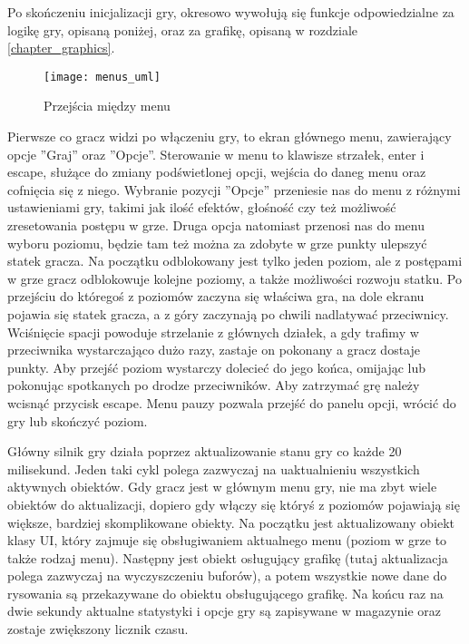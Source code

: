 Po skończeniu inicjalizacji gry, okresowo wywołują się funkcje odpowiedzialne za logikę gry, opisaną poniżej, oraz za grafikę, opisaną w rozdziale \ref{chapter_graphics}.
\newpage


\begin{wrapfigure}{r}{0.39\textwidth}
	\centering
	\noindent\texttt{[image: menus\_uml]}
	\caption{Przej\'scia między menu}
\end{wrapfigure}
Pierwsze co gracz widzi po włączeniu gry, to ekran głównego menu, zawierający opcje ''Graj'' oraz ''Opcje''. Sterowanie w menu to klawisze strzałek, enter i escape, służące do zmiany pod\'swietlonej opcji, wej\'scia do daneg menu oraz cofnięcia się z niego. Wybranie pozycji ''Opcje'' przeniesie nas do menu z różnymi ustawieniami gry, takimi jak ilo\'sć efektów, gło\'sno\'sć czy też możliwo\'sć zresetowania postępu w grze. Druga opcja natomiast przenosi nas do menu wyboru poziomu, będzie tam też można za zdobyte w grze punkty ulepszyć statek gracza. Na początku odblokowany jest tylko jeden poziom, ale z postępami w grze gracz odblokowuje kolejne poziomy, a także możliwo\'sci rozwoju statku. Po przej\'sciu do którego\'s z poziomów zaczyna się wła\'sciwa gra, na dole ekranu pojawia się statek gracza, a z góry zaczynają po chwili nadlatywać przeciwnicy. Wci\'snięcie spacji powoduje strzelanie z głównych działek, a gdy trafimy w przeciwnika wystarczająco dużo razy, zastaje on pokonany a gracz dostaje punkty. Aby przej\'sć poziom wystarczy dolecieć do jego końca, omijając lub pokonując spotkanych po drodze przeciwników. Aby zatrzymać grę należy wcisnąć przycisk escape. Menu pauzy pozwala przej\'sć do panelu opcji, wrócić do gry lub skończyć poziom.\bigskip

\smallskip

Główny silnik gry działa poprzez aktualizowanie stanu gry co każde 20 milisekund. Jeden taki cykl polega zazwyczaj na uaktualnieniu wszystkich aktywnych obiektów. Gdy gracz jest w głównym menu gry, nie ma zbyt wiele obiektów do aktualizacji, dopiero gdy włączy się który\'s z poziomów pojawiają się większe, bardziej skomplikowane obiekty. Na początku jest aktualizowany obiekt klasy UI, który zajmuje się obsługiwaniem aktualnego menu (poziom w grze to także rodzaj menu). Następny jest obiekt osługujący grafikę (tutaj aktualizacja polega zazwyczaj na wyczyszczeniu buforów), a potem wszystkie nowe dane do rysowania są przekazywane do obiektu obsługującego grafikę. Na końcu raz na dwie sekundy aktualne statystyki i opcje gry są zapisywane w magazynie oraz zostaje zwiększony licznik czasu.

